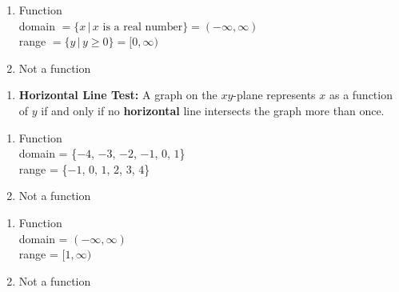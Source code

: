 \begin{multicols}{2}
\begin{enumerate}
\setcounter{enumi}{\value{HW}}


\item Function \\ domain $= \{x \, | \,  \text{$x$ is a real number} \} = (-\infty, \infty)$ \\  range $= \{y \, | \,  y \geq 0 \} = [0,\infty)$

\vfill

\columnbreak

\item  Not a function

\setcounter{HW}{\value{enumi}}
\end{enumerate}
\end{multicols}

\begin{enumerate}
\setcounter{enumi}{\value{HW}}

 \item \textbf{Horizontal Line Test:} A graph on the $xy$-plane represents $x$ as a function of $y$ if and only if no \textbf{horizontal} line intersects the graph more than once.
 
 \setcounter{HW}{\value{enumi}}
\end{enumerate}






\begin{multicols}{2}
\begin{enumerate}
\setcounter{enumi}{\value{HW}}

\item Function \\ domain = \{$-4$, $-3$, $-2$, $-1$, $0$, $1$\} \\ range = \{$-1$, $0$, $1$, $2$, $3$, $4$\}

\vfill

\columnbreak

\item Not a function

\setcounter{HW}{\value{enumi}}
\end{enumerate}
\end{multicols}


\begin{multicols}{2}
\begin{enumerate}
\setcounter{enumi}{\value{HW}}

\item Function \\ domain = $(-\infty, \infty)$ \\ range = $[1, \infty)$
\vfill

\columnbreak

\item Not a function 

\setcounter{HW}{\value{enumi}}
\end{enumerate}
\end{multicols}

